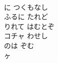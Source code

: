 \documentclass[10pt,b5j]{tarticle} %
\begin{document}
\begin{enumerate}
\begin{minipage}[c]{\blocksize}
    \end{minipage}
    \begin{minipage}[c]{\blocksize}
        
        \vspace{\linespace}
        \item~\\
        に つくもなし\\
        ふるに たれど\\
        りれて はむとぞ\\
        コチャ わせし\\
        のは ぞむ\\
        ヶ
    
    \end{minipage}
\end{enumerate} %
\end{document}
